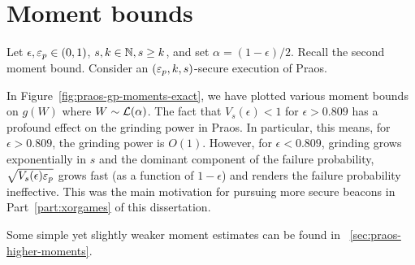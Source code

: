 \section{Moment bounds}\label{sec:praos-discussion-moment-bounds}
Let $\epsilon, \mathsf{\varepsilon}_p \in (0,1)$, $s, k \in \mathbb{N}, s \geq k$, and set $\alpha = (1-\epsilon)/2$. 
Recall the second moment bound. 
Consider an $(\mathsf{\varepsilon}_p, k, s)$-secure execution of Praos.

In Figure~\ref{fig:praos-gp-moments-exact}, 
we have plotted various moment bounds on $g(W)$ 
where $W \sim \mathcal{L}(\alpha)$. 
The fact that $V_s(\epsilon) < 1$ for $\epsilon > 0.809$ 
has a profound effect on the grinding power in Praos. 
In particular, this means, for $\epsilon > 0.809$, 
the grinding power is $O(1)$. 
However, for $\epsilon < 0.809$, 
grinding grows exponentially in $s$ 
and the dominant component of the failure probability, 
$\sqrt{V_s(\epsilon) \mathsf{\varepsilon}_p}$ grows fast 
(as a function of $1-\epsilon$) 
and renders the failure probability ineffective. 
This was the main motivation for pursuing more secure beacons 
in Part~\ref{part:xorgames} of this dissertation.

Some simple yet slightly weaker moment estimates can be found in \Section~\ref{sec:praos-higher-moments}.


